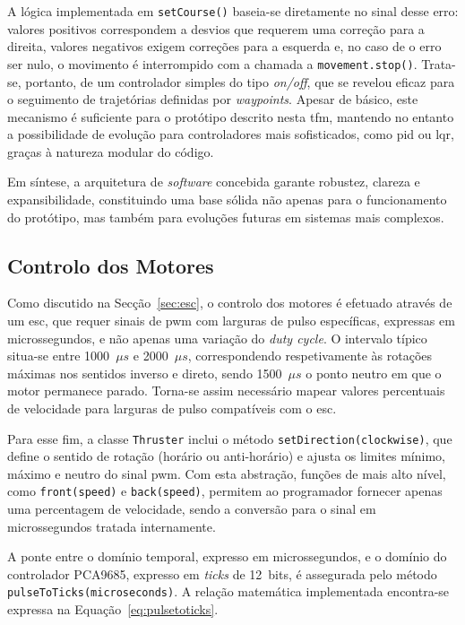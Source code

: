 A lógica implementada em \texttt{setCourse()} baseia-se diretamente no sinal desse erro: valores positivos correspondem a desvios que requerem uma correção para a direita, valores negativos exigem correções para a esquerda e, no caso de o erro ser nulo, o movimento é interrompido com a chamada a \texttt{movement.stop()}. Trata-se, portanto, de um controlador simples do tipo \emph{on/off}, que se revelou eficaz para o seguimento de trajetórias definidas por \emph{waypoints}. Apesar de básico, este mecanismo é suficiente para o protótipo descrito nesta \gls{tfm}, mantendo no entanto a possibilidade de evolução para controladores mais sofisticados, como \gls{pid} ou \gls{lqr}, graças à natureza modular do código.  

Em síntese, a arquitetura de \emph{software} concebida garante robustez, clareza e expansibilidade, constituindo uma base sólida não apenas para o funcionamento do protótipo, mas também para evoluções futuras em sistemas mais complexos.

\subsection{Controlo dos Motores}
\label{subsec:controlo-de-motores}

Como discutido na Secção~\ref{sec:esc}, o controlo dos motores é efetuado através de um \gls{esc}, que requer sinais de \gls{pwm} com larguras de pulso específicas, expressas em microssegundos, e não apenas uma variação do \emph{duty cycle}. O intervalo típico situa-se entre 1000~\(\mu s\) e 2000~\(\mu s\), correspondendo respetivamente às rotações máximas nos sentidos inverso e direto, sendo 1500~\(\mu s\) o ponto neutro em que o motor permanece parado. Torna-se assim necessário mapear valores percentuais de velocidade para larguras de pulso compatíveis com o \gls{esc}.  

Para esse fim, a classe \texttt{Thruster} inclui o método \texttt{setDirection(clockwise)}, que define o sentido de rotação (horário ou anti-horário) e ajusta os limites mínimo, máximo e neutro do sinal \gls{pwm}. Com esta abstração, funções de mais alto nível, como \texttt{front(speed)} e \texttt{back(speed)}, permitem ao programador fornecer apenas uma percentagem de velocidade, sendo a conversão para o sinal em microssegundos tratada internamente.  

A ponte entre o domínio temporal, expresso em microssegundos, e o domínio do controlador PCA9685, expresso em \emph{ticks} de 12~bits, é assegurada pelo método \texttt{pulseToTicks(microseconds)}. A relação matemática implementada encontra-se expressa na Equação~\ref{eq:pulsetoticks}.  

